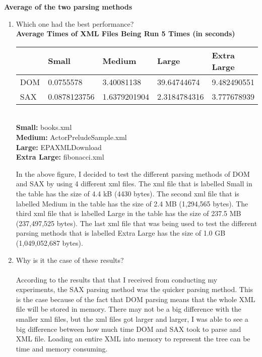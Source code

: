 \documentclass[11pt,english]{article}
\begin{document}
\textbf{Average of the two parsing methods}
\begin{enumerate}
\item{Which one had the best performance?}
\\
\textbf{Average Times of XML Files Being Run 5 Times (in seconds)}
\begin{center}
  \begin{tabular}{| l | l | l | l | l |}
    \hline
     & Small & Medium & Large & Extra Large \\ \hline
    DOM & 0.0755578  & 3.40081138 & 39.64744674  & 9.482490551\\ \hline
    SAX & 0.0878123756 & 1.6379201904 & 2.3184784316 & 3.777678939\\
    \hline
  \end{tabular}
  \\
 \textbf{Small:} books.xml \\ \textbf{Medium:} ActorPreludeSample.xml \\
  \textbf{Large:} EPAXMLDownload \\ \textbf{Extra Large:} fibonacci.xml
\end{center}
In the above figure, I decided to test the different parsing methods of DOM and SAX by using 4 different xml files. The xml file that is labelled Small in the table has the size of 4.4 kB (4430 bytes). The second xml file that is labelled Medium in the table has the size of 2.4 MB (1,294,565 bytes). The third xml file that is labelled Large in the table has the size of 237.5 MB (237,497,525 bytes). The last xml file that was being used to test the different parsing methods that is labelled Extra Large has the size of 1.0 GB (1,049,052,687 bytes). 
\item{Why is it the case of these results?}
\\
\\
\indent According to the results that that I received from conducting my experiments, the SAX parsing method was the quicker parsing method. This is the case because of the fact that DOM parsing means that the whole XML file will be stored in memory. There may not be a big difference with the smaller xml files, but the xml files got larger and larger, I was able to see a big difference between how much time DOM  and SAX took to parse and XML file. Loading an entire XML into memory to represent the tree can be time and memory consuming. 
\par

\end{enumerate}
\end{document}
